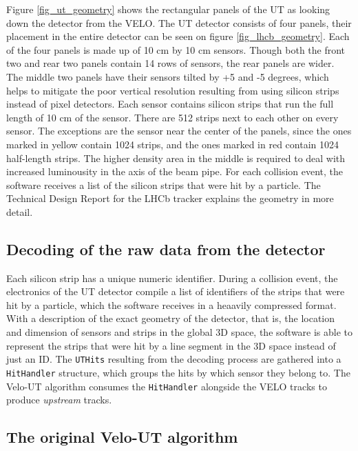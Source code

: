 \documentclass[12pt]{article}
\newcommand{\code}[1]{\texttt{#1}}
\begin{document}
Figure \ref{fig_ut_geometry} shows the rectangular panels of the UT as looking down the detector from the VELO. The UT detector consists of four panels, their placement in the entire detector can be seen on figure \ref{fig_lhcb_geometry}. Each of the four panels is made up of 10 cm by 10 cm sensors. Though both the front two and rear two panels contain 14 rows of sensors, the rear panels are wider. The middle two panels have their sensors tilted by +5 and -5 degrees, which helps to mitigate the poor vertical resolution resulting from using silicon strips instead of pixel detectors. Each sensor contains silicon strips that run the full length of 10 cm of the sensor. There are 512 strips next to each other on every sensor. The exceptions are the sensor near the center of the panels, since the ones marked in yellow contain 1024 strips, and the ones marked in red contain 1024 half-length strips. The higher density area in the middle is required to deal with increased luminousity in the axis of the beam pipe. For each collision event, the software receives a list of the silicon strips that were hit by a particle. The Technical Design Report for the LHCb tracker\cite{tracker_tdr} explains the geometry in more detail.


\subsection{Decoding of the raw data from the detector}

Each silicon strip has a unique numeric identifier. During a collision event, the electronics of the UT detector compile a list of identifiers of the strips that were hit by a particle, which the software receives in a heaavily compressed format. With a description of the exact geometry of the detector, that is, the location and dimension of sensors and strips in the global 3D space, the software is able to represent the strips that were hit by a line segment in the 3D space instead of just an ID. The \code{UTHits} resulting from the  decoding process are gathered into a \code{HitHandler} structure, which groups the hits by which sensor they belong to. The Velo-UT algorithm consumes the \code{HitHandler} alongside the VELO tracks to produce \textit{upstream} tracks.


\subsection{The original Velo-UT algorithm}\label{sec_velout_desc}
\end{document}
